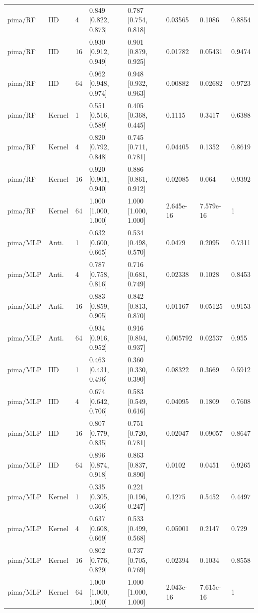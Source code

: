 \begin{tabular}{llllllll}
pima/RF & IID & 4 & 0.849 [0.822, 0.873] & 0.787 [0.754, 0.818] & 0.03565 & 0.1086 & 0.8854 \\
pima/RF & IID & 16 & 0.930 [0.912, 0.949] & 0.901 [0.879, 0.925] & 0.01782 & 0.05431 & 0.9474 \\
pima/RF & IID & 64 & 0.962 [0.948, 0.974] & 0.948 [0.932, 0.963] & 0.00882 & 0.02682 & 0.9723 \\
pima/RF & Kernel & 1 & 0.551 [0.516, 0.589] & 0.405 [0.368, 0.445] & 0.1115 & 0.3417 & 0.6388 \\
pima/RF & Kernel & 4 & 0.820 [0.792, 0.848] & 0.745 [0.711, 0.781] & 0.04405 & 0.1352 & 0.8619 \\
pima/RF & Kernel & 16 & 0.920 [0.901, 0.940] & 0.886 [0.861, 0.912] & 0.02085 & 0.064 & 0.9392 \\
pima/RF & Kernel & 64 & 1.000 [1.000, 1.000] & 1.000 [1.000, 1.000] & 2.645e-16 & 7.579e-16 & 1 \\
pima/MLP & Anti. & 1 & 0.632 [0.600, 0.665] & 0.534 [0.498, 0.570] & 0.0479 & 0.2095 & 0.7311 \\
pima/MLP & Anti. & 4 & 0.787 [0.758, 0.816] & 0.716 [0.681, 0.749] & 0.02338 & 0.1028 & 0.8453 \\
pima/MLP & Anti. & 16 & 0.883 [0.859, 0.905] & 0.842 [0.813, 0.870] & 0.01167 & 0.05125 & 0.9153 \\
pima/MLP & Anti. & 64 & 0.934 [0.916, 0.952] & 0.916 [0.894, 0.937] & 0.005792 & 0.02537 & 0.955 \\
pima/MLP & IID & 1 & 0.463 [0.431, 0.496] & 0.360 [0.330, 0.390] & 0.08322 & 0.3669 & 0.5912 \\
pima/MLP & IID & 4 & 0.674 [0.642, 0.706] & 0.583 [0.549, 0.616] & 0.04095 & 0.1809 & 0.7608 \\
pima/MLP & IID & 16 & 0.807 [0.779, 0.835] & 0.751 [0.720, 0.781] & 0.02047 & 0.09057 & 0.8647 \\
pima/MLP & IID & 64 & 0.896 [0.874, 0.918] & 0.863 [0.837, 0.890] & 0.0102 & 0.0451 & 0.9265 \\
pima/MLP & Kernel & 1 & 0.335 [0.305, 0.366] & 0.221 [0.196, 0.247] & 0.1275 & 0.5452 & 0.4497 \\
pima/MLP & Kernel & 4 & 0.637 [0.608, 0.669] & 0.533 [0.499, 0.568] & 0.05001 & 0.2147 & 0.729 \\
pima/MLP & Kernel & 16 & 0.802 [0.776, 0.829] & 0.737 [0.705, 0.769] & 0.02394 & 0.1034 & 0.8558 \\
pima/MLP & Kernel & 64 & 1.000 [1.000, 1.000] & 1.000 [1.000, 1.000] & 2.043e-16 & 7.615e-16 & 1 \\
\bottomrule
\end{tabular}

\endgroup
